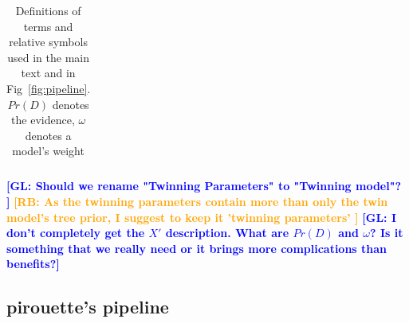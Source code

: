 \documentclass{article}
\newcommand{\giovanni}[1]{\textcolor{blue}{\textbf{[GL: #1]}}}
\newcommand{\richel}[1]{\textcolor{orange}{\textbf{[RB: #1]}}}
\begin{document}
\begin{table}
\begin{tabular}{|@{}c|p{4cm}|p{9cm}|p{3cm}@{}|}
    \hline 
  \end{tabular}
  \caption{
    Definitions of terms and relative symbols used in the main text and in 
    Fig~\ref{fig:pipeline}. $Pr(D)$ denotes the evidence, $\omega$ denotes
    a model's weight 
  }
  \label{tab:definitions}
  \giovanni{
    Should we rename "Twinning Parameters" to "Twinning model"?
  }
  \richel{
    As the twinning parameters contain more than only the twin model's tree 
    prior, I suggest to keep it 'twinning parameters'
  }
  \giovanni{I don't completely get the $X'$ description. What are $Pr(D)$ and 
$\omega$? Is it something that we really need or it brings more complications 
than benefits?}
\end{table}

\subsection{pirouette's pipeline}
\end{document}
